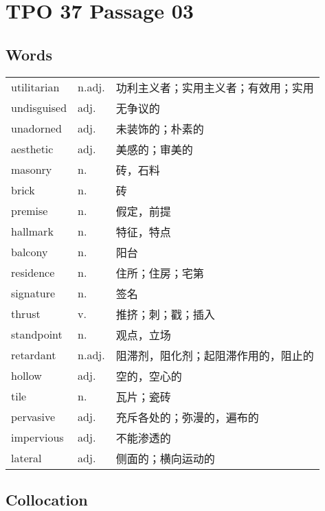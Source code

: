 \section{TPO 37 Passage 03}

\subsection{Words}

\begin{tabular}{lll}
    utilitarian & n.adj. & 功利主义者；实用主义者；有效用；实用 \\
    undisguised & adj.   & 无争议的               \\
    unadorned   & adj.   & 未装饰的；朴素的           \\
    aesthetic   & adj.   & 美感的；审美的            \\
    masonry     & n.     & 砖，石料               \\
    brick       & n.     & 砖                  \\
    premise     & n.     & 假定，前提              \\
    hallmark    & n.     & 特征，特点              \\
    balcony     & n.     & 阳台                 \\
    residence   & n.     & 住所；住房；宅第           \\
    signature   & n.     & 签名                 \\
    thrust      & v.     & 推挤；刺；戳；插入          \\
    standpoint  & n.     & 观点，立场              \\
    retardant   & n.adj. & 阻滞剂，阻化剂；起阻滞作用的，阻止的 \\
    hollow      & adj.   & 空的，空心的             \\
    tile        & n.     & 瓦片；瓷砖              \\
    pervasive   & adj.   & 充斥各处的；弥漫的，遍布的      \\
    impervious  & adj.   & 不能渗透的              \\
    lateral     & adj.   & 侧面的；横向运动的          \\
\end{tabular}

\subsection{Collocation}


